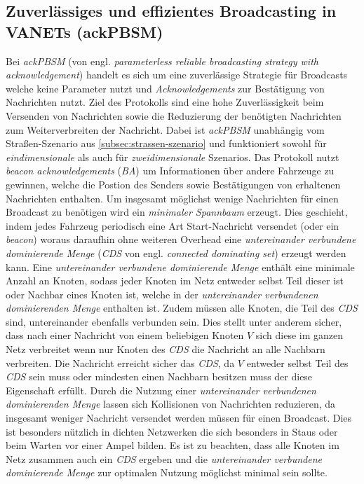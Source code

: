 \documentclass[english,runningheads,a4paper]{llncs}[2018/03/10]
\begin{document}
\subsection{Zuverlässiges und effizientes Broadcasting in VANETs (ackPBSM)}
Bei \textit{ackPBSM} (von engl. \textit{parameterless reliable broadcasting strategy with acknowledgement}) handelt es sich um eine zuverlässige Strategie für Broadcasts welche keine Parameter nutzt und \textit{Acknowledgements} zur Bestätigung von Nachrichten nutzt.
Ziel des Protokolls sind eine hohe Zuverlässigkeit beim Versenden von Nachrichten sowie die Reduzierung der benötigten Nachrichten zum Weiterverbreiten der Nachricht.
Dabei ist \textit{ackPBSM} unabhängig vom Straßen-Szenario aus \ref{subsec:strassen-szenario} und funktioniert sowohl für \textit{eindimensionale} als auch für \textit{zweidimensionale} Szenarios.
Das Protokoll nutzt \textit{beacon acknowledgements} (\textit{BA}) um Informationen über andere Fahrzeuge zu gewinnen, welche die Postion des Senders sowie Bestätigungen von erhaltenen Nachrichten enthalten.
Um insgesamt möglichst wenige Nachrichten für einen Broadcast zu benötigen wird ein \textit{minimaler Spannbaum} erzeugt.
Dies geschieht, indem jedes Fahrzeug periodisch eine Art Start-Nachricht versendet (oder ein \textit{beacon}) woraus daraufhin ohne weiteren Overhead eine \textit{untereinander verbundene dominierende Menge} (\textit{CDS} von engl. \textit{connected dominating set}) erzeugt werden kann.
Eine \textit{untereinander verbundene dominierende Menge} enthält eine minimale Anzahl an Knoten, sodass jeder Knoten im Netz entweder selbst Teil dieser ist oder Nachbar eines Knoten ist, welche in der \textit{untereinander verbundenen dominierenden Menge} enthalten ist.
Zudem müssen alle Knoten, die Teil des \textit{CDS} sind, untereinander ebenfalls verbunden sein.
Dies stellt unter anderem sicher, dass nach einer Nachricht von einem beliebigen Knoten $V$ sich diese im ganzen Netz verbreitet wenn nur Knoten des \textit{CDS} die Nachricht an alle Nachbarn verbreiten.
Die Nachricht erreicht sicher das \textit{CDS}, da $V$ entweder selbst Teil des \textit{CDS} sein muss oder mindesten einen Nachbarn besitzen muss der diese Eigenschaft erfüllt.
Durch die Nutzung einer \textit{untereinander verbundenen dominierenden Menge} lassen sich Kollisionen von Nachrichten reduzieren, da insgesamt weniger Nachricht versendet werden müssen für einen Broadcast.
Dies ist besonders nützlich in dichten Netzwerken die sich besonders in Staus oder beim Warten vor einer Ampel bilden.
Es ist zu beachten, dass alle Knoten im Netz zusammen auch ein \textit{CDS} ergeben und die \textit{untereinander verbundene dominierende Menge} zur optimalen Nutzung möglichst minimal sein sollte\cite{conti2013mobile}.\\
\end{document}
